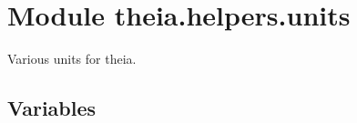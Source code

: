 %
%
%


\section{Module theia.helpers.units}

    \label{theia:helpers:units}
Various units for theia.



  \subsection{Variables}

